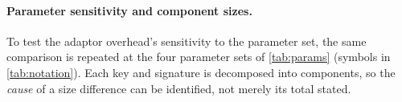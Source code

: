 \paragraph{Parameter sensitivity and component sizes.}
To test the adaptor overhead's sensitivity to the parameter set, the same
comparison is repeated at the four parameter sets of \cref{tab:params} (symbols in
\cref{tab:notation}). Each key and signature is decomposed into components, so the
\emph{cause} of a size difference can be identified, not merely its total stated.

